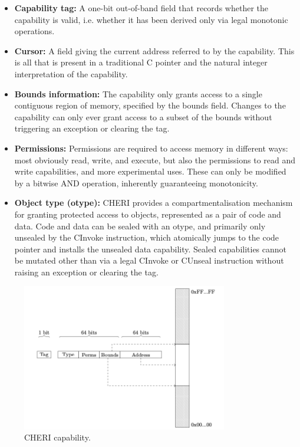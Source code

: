\begin{itemize}

\item \textbf{Capability tag:} A one-bit out-of-band field that records whether the capability is valid, i.e. whether it has been derived only 
via legal monotonic operations.

\item \textbf{Cursor:} A field giving the current address referred to by the capability. This is all 
that is present in a traditional C pointer and the natural integer interpretation of the capability.

\item \textbf{Bounds information:} The capability only grants access to a single contiguous region of memory, specified by the bounds field. Changes to the capability can only ever grant access 
to a subset of the bounds without triggering an exception or clearing the tag.

\item \textbf{Permissions:} Permissions are required to access memory in different ways: most obviously read, write, and execute, but also the permissions to read and write capabilities, and more
experimental uses. These can only be modified by a bitwise AND operation, inherently guaranteeing monotonicity.

\item \textbf{Object type (otype):} CHERI provides a compartmentalisation mechanism for granting protected access to objects, represented as a 
pair of code and data. Code and data can be sealed with an otype, and primarily only unsealed by the CInvoke instruction, which atomically jumps to the code pointer and installs 
the unsealed data capability. Sealed capabilities cannot be mutated other than via a legal CInvoke or CUnseal instruction without 
raising an exception or clearing the tag.

\end{itemize}

\begin{figure}[h]
  \includegraphics[width=0.8\textwidth]{chericapability.png}
  \caption{CHERI capability.}
  \label{fig:FlexPointer}
\end{figure}

